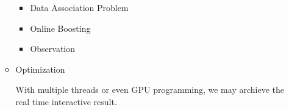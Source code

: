 \documentclass[a4paper]{article}
\begin{document}
\begin{enumerate}
\begin{itemize}
\begin{itemize}

\item Data Association Problem

\item Online Boosting

\item Observation

\end{itemize}

\item Optimization

With multiple threads or even GPU programming, we may archieve the real time interactive result.


\end{itemize}

\end{enumerate}

\clearpage


\end{document}
